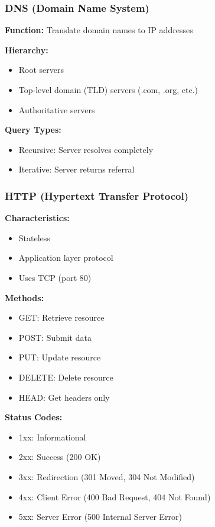 \documentclass[11pt,a4paper]{article}
\begin{document}
\subsubsection{DNS (Domain Name System)}

\textbf{Function:} Translate domain names to IP addresses

\textbf{Hierarchy:}
\begin{itemize}
    \item Root servers
    \item Top-level domain (TLD) servers (.com, .org, etc.)
    \item Authoritative servers
\end{itemize}

\textbf{Query Types:}
\begin{itemize}
    \item Recursive: Server resolves completely
    \item Iterative: Server returns referral
\end{itemize}

\subsubsection{HTTP (Hypertext Transfer Protocol)}

\textbf{Characteristics:}
\begin{itemize}
    \item Stateless
    \item Application layer protocol
    \item Uses TCP (port 80)
\end{itemize}

\textbf{Methods:}
\begin{itemize}
    \item GET: Retrieve resource
    \item POST: Submit data
    \item PUT: Update resource
    \item DELETE: Delete resource
    \item HEAD: Get headers only
\end{itemize}

\textbf{Status Codes:}
\begin{itemize}
    \item 1xx: Informational
    \item 2xx: Success (200 OK)
    \item 3xx: Redirection (301 Moved, 304 Not Modified)
    \item 4xx: Client Error (400 Bad Request, 404 Not Found)
    \item 5xx: Server Error (500 Internal Server Error)
\end{itemize}
\end{document}
